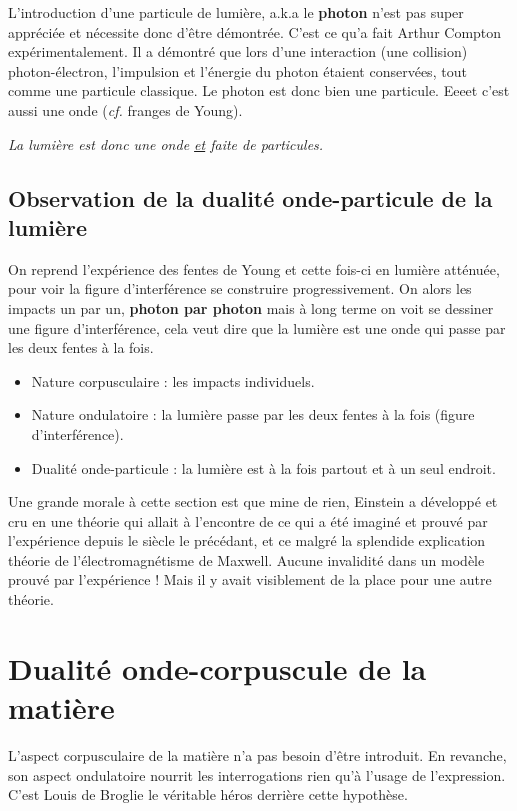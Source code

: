 \documentclass[12pt, a4paper]{book}
\begin{document}
L'introduction d'une particule de lumière, a.k.a le \textbf{photon} n'est pas super appréciée et nécessite donc d'être démontrée. C'est ce qu'a fait Arthur Compton expérimentalement. Il a démontré que lors d'une interaction (une collision) photon-électron, l'impulsion et l'énergie du photon étaient conservées, tout comme une particule classique. Le photon est donc bien une particule. Eeeet c'est aussi une onde (\textit{cf.} franges de Young). 
\begin{center}
\begin{large}
\textit{La lumière est donc une onde \underline{et} faite de particules.}
\end{large}
\end{center}

\subsection{Observation de la dualité onde-particule de la lumière}
On reprend l'expérience des fentes de Young et cette fois-ci en lumière atténuée, pour voir la figure d'interférence se construire progressivement. On alors les impacts un par un, \textbf{photon par photon} mais à long terme on voit se dessiner une figure d'interférence, cela veut dire que la lumière est une onde qui passe par les deux fentes à la fois.

\begin{itemize}
\item Nature corpusculaire : les impacts individuels.
\item Nature ondulatoire : la lumière passe par les deux fentes à la fois (figure d'interférence).
\item Dualité onde-particule : la lumière est à la fois partout et à un seul endroit. \end{itemize}

Une grande morale à cette section est que mine de rien, Einstein a développé et cru en une théorie qui allait à l'encontre de ce qui a été imaginé et prouvé par l'expérience depuis le siècle le précédant, et ce malgré la splendide explication théorie de l'électromagnétisme de Maxwell. Aucune invalidité dans un modèle prouvé par l'expérience ! Mais il y avait visiblement de la place pour une autre théorie. 
\section{Dualité onde-corpuscule de la matière}
L'aspect corpusculaire de la matière n'a pas besoin d'être introduit. En revanche, son aspect ondulatoire nourrit les interrogations rien qu'à l'usage de l'expression. C'est Louis de Broglie le véritable héros derrière cette hypothèse.
\end{document}
